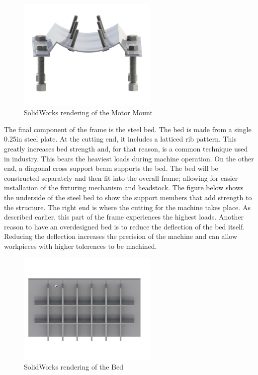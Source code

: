 \begin{figure}[H]
    \centering
    \includegraphics[width=0.6\textwidth]{./fall-report pictures/Chapter2-MachineDescription/MotorMount}
    \caption{SolidWorks rendering of the Motor Mount}
    \label{fig:Motor Mount}
\end{figure}

The final component of the frame is the steel bed. The bed is made from a single 0.25in steel plate. At the cutting end, it includes a latticed rib pattern. This greatly increases bed strength and, for that reason, is a common technique used in industry. This bears the heaviest loads during machine operation. On the other end, a diagonal cross support beam supports the bed. The bed will be constructed separately and then fit into the overall frame; allowing for easier installation of the fixturing mechanism and headstock. The figure below shows the underside of the steel bed to show the support members that add strength to the structure. The right end is where the cutting for the machine takes place. As described earlier, this part of the frame experiences the highest loads. Another reason to have an overdesigned bed is to reduce the deflection of the bed itself. Reducing the deflection increases the precision of the machine and can allow workpieces with higher tolerences to be machined. 

\begin{figure}[H]
    \centering
    \includegraphics[width=0.6\textwidth]{./fall-report pictures/Chapter2-MachineDescription/Bed}
    \caption{SolidWorks rendering of the Bed}
    \label{fig:Bed}
\end{figure}

